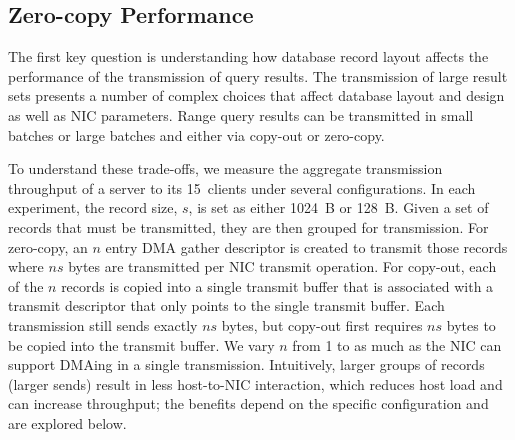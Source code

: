 \subsection{Zero-copy Performance}
\label{sec:zero-copy-tput}

%

The first key question is understanding how database record layout affects the
performance of the transmission of query results.  The transmission of large
result sets presents a number of complex choices that affect
database layout and design as well as NIC parameters.  Range query
results can be transmitted in small batches or large batches and either via
copy-out or zero-copy.

To understand these trade-offs, we measure the aggregate transmission
throughput of a server to its 15~clients under several
configurations.  In each experiment, the record size, $s$, is set as either 1024~B or
128~B. Given a set of records that must be transmitted, they are then grouped
for transmission. For zero-copy, an $n$ entry DMA gather descriptor is created
to transmit those records where $ns$ bytes are transmitted per NIC transmit
operation. For copy-out, each of the $n$ records is copied into a single
transmit buffer that is associated with a transmit descriptor that only points
to the single transmit buffer. Each transmission still sends exactly $ns$
bytes, but copy-out first requires $ns$ bytes to be copied into the transmit buffer.
We vary $n$ from 1 to as much as the NIC can support DMAing in a single transmission.
Intuitively, larger groups of records (larger sends) result in less host-to-NIC
interaction, which reduces host load and can increase throughput; the benefits
depend on the specific configuration and are explored below.

